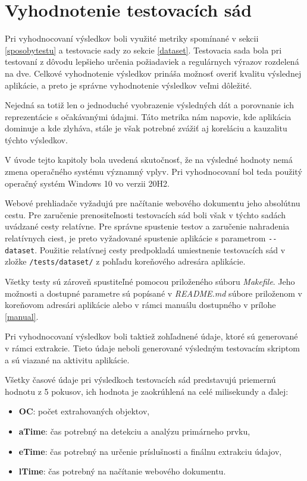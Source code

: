 \newpage

\section{Vyhodnotenie testovacích sád}

Pri vyhodnocovaní výsledkov boli využité metriky spomínané v sekcii \ref{sposobytestu} a testovacie sady zo sekcie \ref{dataset}. Testovacia sada  bola pri testovaní z dôvodu lepšieho určenia požiadaviek a regulárnych výrazov rozdelená na dve. Celkové vyhodnotenie výsledkov prináša možnosť overiť kvalitu výslednej aplikácie, a preto je správne vyhodnotenie výsledkov veľmi dôležité. 

Nejedná sa totiž len o jednoduché vyobrazenie výsledných dát a porovnanie ich reprezentácie s očakávanými údajmi. Táto metrika nám napovie, kde aplikácia dominuje a kde zlyháva, stále je však potrebné zvážiť aj koreláciu a kauzalitu týchto výsledkov. 

V úvode tejto kapitoly bola uvedená skutočnosť, že na výsledné hodnoty nemá zmena operačného systému významný vplyv. Pri vyhodnocovaní bol teda použitý operačný systém Windows 10 vo verzii 20H2.

Webové prehliadače vyžadujú pre načítanie webového dokumentu jeho absolútnu cestu. Pre zaručenie prenositeľnosti testovacích sád boli však v  týchto sadách uvádzané cesty relatívne. Pre správne spustenie testov a zaručenie nahradenia relatívnych ciest, je preto vyžadované spustenie aplikácie s parametrom \texttt{-{}-dataset}. Použitie relatívnej cesty predpokladá umiestnenie testovacích sád v zložke \texttt{/tests/dataset/} z pohľadu koreňového adresára aplikácie.

Všetky testy sú zároveň spustiteľné pomocou priloženého súboru \textit{Makefile}. Jeho možnosti a dostupné parametre sú popísané v \textit{README.md} súbore priloženom v koreňovom adresári aplikácie alebo v rámci manuálu dostupného v prílohe \ref{manual}.

\bigskip

Pri vyhodnocovaní výsledkov boli taktiež zohľadnené údaje, ktoré sú generované v rámci extrakcie. Tieto údaje neboli generované výsledným testovacím skriptom a sú viazané na aktivitu aplikácie.

Všetky časové údaje pri výsledkoch testovacích sád predstavujú priemernú hodnotu z 5 pokusov, ich hodnota je zaokrúhlená na celé milisekundy a ďalej:

\begin{itemize}
    \item \textbf{OC}: počet extrahovaných objektov,
    \item \textbf{aTime}: čas potrebný na detekciu a analýzu primárneho prvku,
    \item \textbf{eTime}: čas potrebný na určenie príslušnosti a finálnu extrakciu údajov,
    \item \textbf{lTime}: čas potrebný na načítanie webového dokumentu.
\end{itemize}

